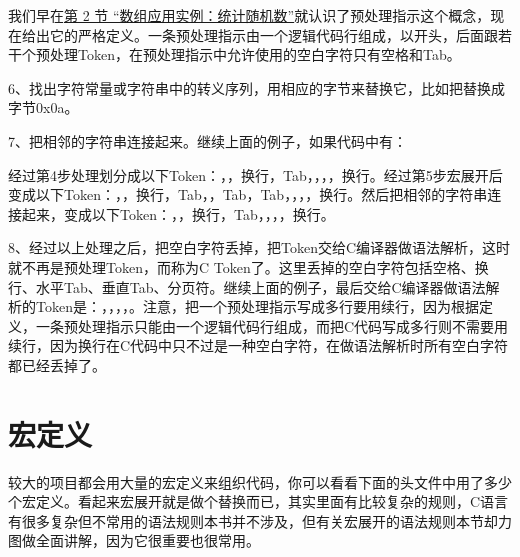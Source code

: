 我们早在\hyperlink{db.ch08s02.id2733695}{第 2 节 “数组应用实例：统计随机数”}就认识了预处理指示这个概念，现在给出它的严格定义。一条预处理指示由一个逻辑代码行组成，以\BookCode{\#}开头，后面跟若干个预处理Token，在预处理指示中允许使用的空白字符只有空格和Tab。



6、找出字符常量或字符串中的转义序列，用相应的字节来替换它，比如把替换成字节0x0a。



7、把相邻的字符串连接起来。继续上面的例子，如果代码中有：




经过第4步处理划分成以下Token：，\BookCode{(\BookSplit{}}，换行，Tab，，\BookCode{)\BookSplit{}}，\BookCode{;\BookSplit{}}，换行。经过第5步宏展开后变成以下Token：，\BookCode{(\BookSplit{}}，换行，Tab，，Tab，Tab，，\BookCode{)\BookSplit{}}，\BookCode{;\BookSplit{}}，换行。然后把相邻的字符串连接起来，变成以下Token：，\BookCode{(\BookSplit{}}，换行，Tab，，\BookCode{)\BookSplit{}}，\BookCode{;\BookSplit{}}，换行。



8、经过以上处理之后，把空白字符丢掉，把Token交给C编译器做语法解析，这时就不再是预处理Token，而称为C Token了。这里丢掉的空白字符包括空格、换行、水平Tab、垂直Tab、分页符。继续上面的例子，最后交给C编译器做语法解析的Token是：，\BookCode{(\BookSplit{}}，，\BookCode{)\BookSplit{}}，\BookCode{;\BookSplit{}}。注意，把一个预处理指示写成多行要用\BookCode{\textbackslash{}}续行，因为根据定义，一条预处理指示只能由一个逻辑代码行组成，而把C代码写成多行则不需要用\BookCode{\textbackslash{}}续行，因为换行在C代码中只不过是一种空白字符，在做语法解析时所有空白字符都已经丢掉了。




\section{宏定义}
%
较大的项目都会用大量的宏定义来组织代码，你可以看看下面的头文件中用了多少个宏定义。看起来宏展开就是做个替换而已，其实里面有比较复杂的规则，C语言有很多复杂但不常用的语法规则本书并不涉及，但有关宏展开的语法规则本节却力图做全面讲解，因为它很重要也很常用。


